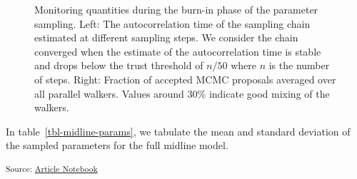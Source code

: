 \documentclass[
  sn-mathphys-num,
]{sn-jnl}
\begin{document}
\begin{figure}


\caption{\label{fig-model-burnin-history}Monitoring quantities during
the burn-in phase of the parameter sampling. Left: The autocorrelation
time of the sampling chain estimated at different sampling steps. We
consider the chain converged when the estimate of the autocorrelation
time is stable and drops below the trust threshold of \(n/50\) where
\(n\) is the number of steps. Right: Fraction of accepted MCMC proposals
averaged over all parallel walkers. Values around 30\% indicate good
mixing of the walkers.}

\end{figure}%

In table~\ref{tbl-midline-params}, we tabulate the mean and standard
deviation of the sampled parameters for the full midline model.

\textsubscript{Source:
\href{https://rmnldwg.github.io/bilateral-paper/manuscript-preview.html}{Article
Notebook}}
\end{document}
